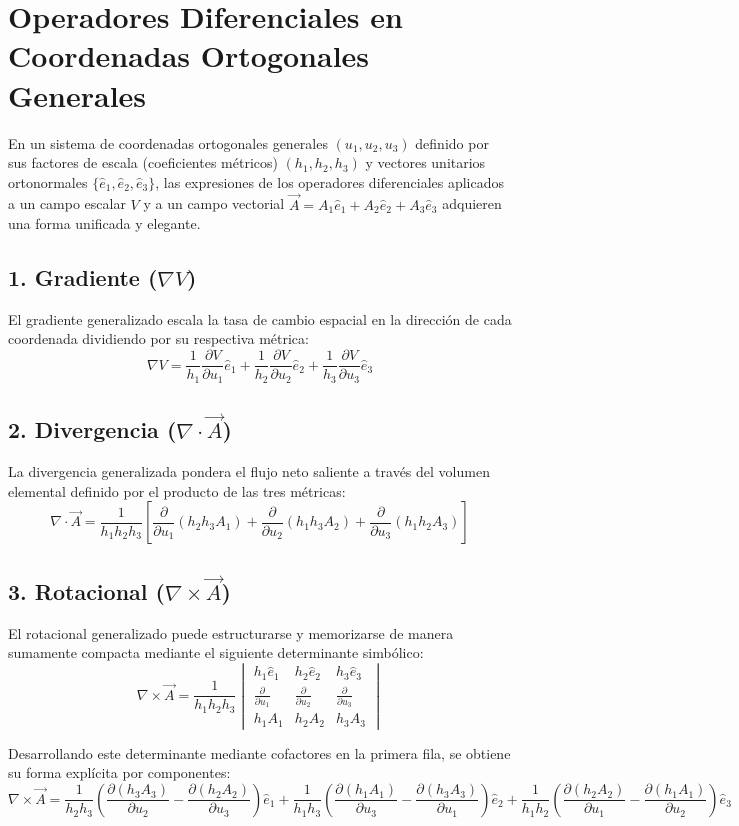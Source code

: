 \documentclass[11pt, a4paper]{article}
\begin{document}
\vspace{0.5cm}

\section{Operadores Diferenciales en Coordenadas Ortogonales Generales}

En un sistema de coordenadas ortogonales generales $(u_1, u_2, u_3)$ definido por sus factores de escala (coeficientes métricos) $(h_1, h_2, h_3)$ y vectores unitarios ortonormales $\{\hat{e}_1, \hat{e}_2, \hat{e}_3\}$, las expresiones de los operadores diferenciales aplicados a un campo escalar $V$ y a un campo vectorial $\vec{A} = A_1\hat{e}_1 + A_2\hat{e}_2 + A_3\hat{e}_3$ adquieren una forma unificada y elegante.

\subsection{1. Gradiente ($\nabla V$)}
El gradiente generalizado escala la tasa de cambio espacial en la dirección de cada coordenada dividiendo por su respectiva métrica:
$$\boxed{\nabla V = \frac{1}{h_1}\frac{\partial V}{\partial u_1}\hat{e}_1 + \frac{1}{h_2}\frac{\partial V}{\partial u_2}\hat{e}_2 + \frac{1}{h_3}\frac{\partial V}{\partial u_3}\hat{e}_3}$$

\subsection{2. Divergencia ($\nabla \cdot \vec{A}$)}
La divergencia generalizada pondera el flujo neto saliente a través del volumen elemental definido por el producto de las tres métricas:
$$\boxed{\nabla \cdot \vec{A} = \frac{1}{h_1 h_2 h_3} \left[ \frac{\partial}{\partial u_1}(h_2 h_3 A_1) + \frac{\partial}{\partial u_2}(h_1 h_3 A_2) + \frac{\partial}{\partial u_3}(h_1 h_2 A_3) \right]}$$

\subsection{3. Rotacional ($\nabla \times \vec{A}$)}
El rotacional generalizado puede estructurarse y memorizarse de manera sumamente compacta mediante el siguiente determinante simbólico:
$$\nabla \times \vec{A} = \frac{1}{h_1 h_2 h_3} \begin{vmatrix} h_1\hat{e}_1 & h_2\hat{e}_2 & h_3\hat{e}_3 \\ \frac{\partial}{\partial u_1} & \frac{\partial}{\partial u_2} & \frac{\partial}{\partial u_3} \\ h_1 A_1 & h_2 A_2 & h_3 A_3 \end{vmatrix}$$

Desarrollando este determinante mediante cofactores en la primera fila, se obtiene su forma explícita por componentes:
$$\boxed{\nabla \times \vec{A} = \frac{1}{h_2 h_3} \left( \frac{\partial (h_3 A_3)}{\partial u_2} - \frac{\partial (h_2 A_2)}{\partial u_3} \right)\hat{e}_1 + \frac{1}{h_1 h_3} \left( \frac{\partial (h_1 A_1)}{\partial u_3} - \frac{\partial (h_3 A_3)}{\partial u_1} \right)\hat{e}_2 + \frac{1}{h_1 h_2} \left( \frac{\partial (h_2 A_2)}{\partial u_1} - \frac{\partial (h_1 A_1)}{\partial u_2} \right)\hat{e}_3}$$
\end{document}
